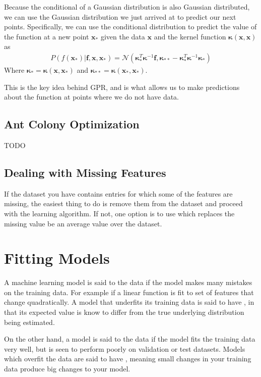 Because the conditional of a Gaussian distribution is also Gaussian distributed, we can use the Gaussian distribution we just arrived at to predict our next points. Specifically, we can use the conditional distribution to predict the value of the function at a new point $\textbf{x}_*$ given the data $\textbf{x}$ and the kernel function $\boldsymbol{\kappa}(\textbf{x},\textbf{x})$ as
\begin{align}
    P(f(\textbf{x}_*)|\textbf{f}, \textbf{x}, \textbf{x}_*) = \mathcal{N}(\boldsymbol{\kappa}_*^T\boldsymbol{\kappa}^{-1}\textbf{f}, \boldsymbol{\kappa}_{**} - \boldsymbol{\kappa}_*^T\boldsymbol{\kappa}^{-1}\boldsymbol{\kappa}_*)
\end{align}
Where $\boldsymbol{\kappa}_* = \boldsymbol{\kappa}(\textbf{x},\textbf{x}_*)$ and $\boldsymbol{\kappa}_{**} = \boldsymbol{\kappa}(\textbf{x}_*,\textbf{x}_*)$.


This is the key idea behind GPR, and is what allows us to make predictions about the function at points where we do not have data.


\subsection{Ant Colony Optimization}
TODO

\subsection{Dealing with Missing Features}
If the dataset you have contains entries for which some of the features are missing, the easiest thing to do is remove them from the dataset and proceed with the learning algorithm. If not, one option is to use  which replaces the missing value be an average value over the dataset.

\section{Fitting Models}

A machine learning model is said to  the data if the model makes many mistakes on the training data. For example if a linear function is fit to set of features that change quadratically. A model that underfits its training data is said to have , in that its expected value is know to differ from the true underlying distribution being estimated.

On the other hand, a model is said to  the data if the model fits the training data very well, but is seen to perform poorly on validation or test datasets. Models which overfit the data are said to have , meaning small changes in your training data produce big changes to your model.

